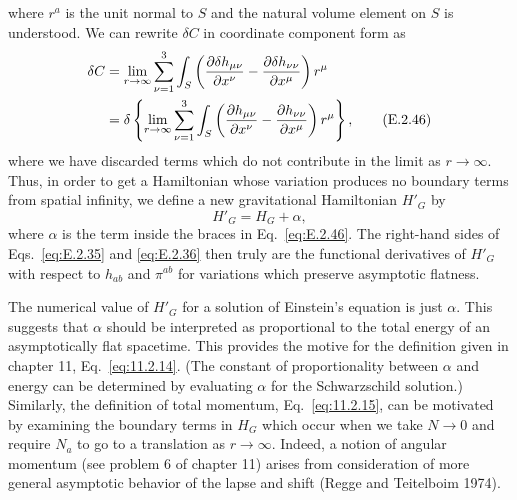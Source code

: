 where \(r^a\) is the unit normal to \(S\) and the natural volume element on \(S\)
is understood. We can rewrite \(\delta C\) in coordinate component form as
\begin{align}
  \delta C
    &=\lim_{r\to\infty}\sum_{\nu=1}^{3}\int_S
      \left(\frac{\partial\delta h_{\mu\nu}}{\partial x^\nu}
        -\frac{\partial\delta h_{\nu\nu}}{\partial x^\mu}\right)r^\mu\notag\\
    &=\delta\left\{\lim_{r\to\infty}\sum_{\nu=1}^{3}\int_S
      \left(\frac{\partial h_{\mu\nu}}{\partial x^\nu}
        -\frac{\partial h_{\nu\nu}}{\partial x^\mu}\right)r^\mu\right\},
  \tag{E.2.46}\label{eq:E.2.46}
\end{align}
where we have discarded terms which do not contribute in the limit as
\(r\to\infty\). Thus, in order to get a Hamiltonian whose variation produces no
boundary terms from spatial infinity, we define a new gravitational Hamiltonian
\(H'_G\) by
\begin{equation}
  H'_G=H_G+\alpha,
  \tag{E.2.47}\label{eq:E.2.47}
\end{equation}
where \(\alpha\) is the term inside the braces in Eq.~\eqref{eq:E.2.46}. The
right-hand sides of Eqs.~\eqref{eq:E.2.35} and \eqref{eq:E.2.36} then truly are the
functional derivatives of \(H'_G\) with respect to \(h_{ab}\) and \(\pi^{ab}\) for
variations which preserve asymptotic flatness.

The numerical value of \(H'_G\) for a solution of Einstein's equation is just
\(\alpha\). This suggests that \(\alpha\) should be interpreted as proportional to
the total energy of an asymptotically flat spacetime. This provides the motive for
the definition given in chapter 11, Eq.~\eqref{eq:11.2.14}. (The constant of
proportionality between \(\alpha\) and energy can be determined by evaluating
\(\alpha\) for the Schwarzschild solution.) Similarly, the definition of total
momentum, Eq.~\eqref{eq:11.2.15}, can be motivated by examining the boundary
terms in \(H_G\) which occur when we take \(N\to0\) and require \(N_a\) to go to a
translation as \(r\to\infty\). Indeed, a notion of angular momentum (see problem 6
of chapter 11) arises from consideration of more general asymptotic behavior of the
lapse and shift (Regge and Teitelboim 1974).

